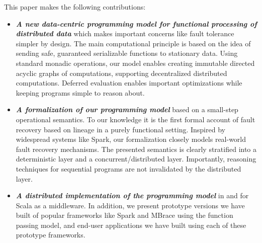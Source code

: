 \documentclass[10pt]{sigplanconf}
\theoremstyle{definition}
\theoremstyle{definition}
\newcommand{\fixme}[1]{{\color{gray}\itshape#1}}
\begin{document}
This paper makes the following contributions:

\begin{itemize} %

\item {\bf\em A new data-centric programming model for functional processing of
  distributed data} which makes important concerns like fault tolerance simpler by
  design. The main computational principle is based on the
  idea of sending safe, guaranteed serializable functions to stationary data.
  Using standard monadic operations, our model enables creating immutable
  directed acyclic graphs of computations, supporting decentralized distributed
  computations. Deferred evaluation enables important optimizations while keeping
  programs simple to reason about.

\item {\bf\em A formalization of our programming model} based on a small-step
  operational  semantics. To our knowledge it is the first formal account of
  fault recovery based on lineage in a purely functional setting. Inspired by
  widespread systems like Spark, our formalization closely models real-world
  fault recovery mechanisms. The presented semantics is clearly stratified into
  a deterministic layer and a concurrent/distributed layer. Importantly,
  reasoning techniques for sequential programs are not invalidated by the
  distributed layer.

\item {\bf\em A distributed implementation of the programming model} in and for
  Scala as a middleware. In addition, we present prototype versions we have built
  of popular frameworks like Spark and MBrace using the function passing model, and
  end-user applications we have built using each of these prototype frameworks.




\end{itemize}
\end{document}
